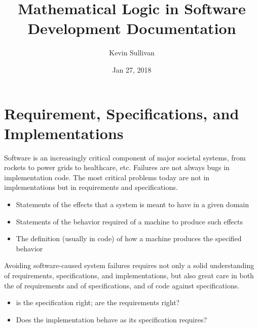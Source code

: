 \documentclass[letterpaper,10pt,english]{sphinxmanual}
\title{Mathematical Logic in Software Development Documentation}
\date{Jan 27, 2018}
\author{Kevin Sullivan}
\begin{document}
\maketitle
\sphinxtableofcontents
{}\label{\detokenize{index::doc}}



\chapter{Requirement, Specifications, and Implementations}
\label{\detokenize{01-reqs-specs-impls:welcome-to-mathematical-logic-in-software-development}}\label{\detokenize{01-reqs-specs-impls:requirement-specifications-and-implementations}}\label{\detokenize{01-reqs-specs-impls::doc}}
Software is an increasingly critical component of major societal
systems, from rockets to power grids to healthcare, etc. Failures are
not always bugs in implementation code. The most critical problems
today are not in implementations but in requirements and
specifications.
\begin{itemize}
\item {} 
 Statements of the effects that a system is meant to have in a given domain

\item {} 
 Statements of the behavior required of a machine to produce such effects

\item {} 
 The definition (usually in code) of how a machine produces the specified behavior

\end{itemize}

Avoiding software-caused system failures requires not only a solid
understanding of requirements, specifications, and implementations,
but also great care in both the  of requirements and of
specifications, and  of code against specifications.
\begin{itemize}
\item {} 
  is the specification right; are the requirements right?

\item {} 
  Does the implementation behave as its specification requires?

\end{itemize}
\end{document}
